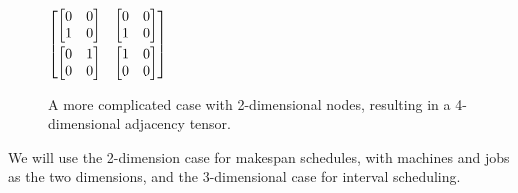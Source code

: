 \begin{figure}[H]
	\begin{center}
		\begin{minipage}{0.3\textwidth}
			\begin{center}
			\end{center}
		\end{minipage}
		\begin{minipage}{0.3\textwidth}
			\begin{center}
				$\begin{bmatrix}
					\begin{bmatrix}
						0&0\\
						1&0\\
					\end{bmatrix}&
					\begin{bmatrix}
						0&0\\
						1&0\\
					\end{bmatrix}\vspace{0.1cm}\\
					\begin{bmatrix}
						0&1\\
						0&0\\
						\end{bmatrix}&
						\begin{bmatrix}
						1&0\\
						0&0\\
						\end{bmatrix}\\
				\end{bmatrix}$
			\end{center}
		\end{minipage}
		
	\end{center}
	\caption{A more complicated case with 2-dimensional nodes, resulting in a 4-dimensional adjacency tensor.}
\end{figure}

We will use the 2-dimension case for makespan schedules, with machines and jobs as the two dimensions, and the 3-dimensional case for interval scheduling.


